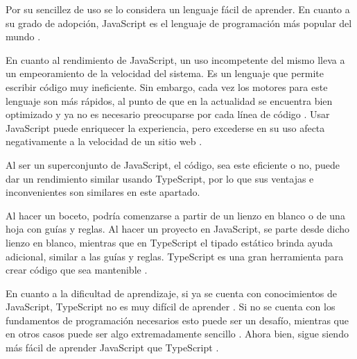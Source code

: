 \documentclass[twoside]{article}
\begin{document}
Por su sencillez de uso se lo considera un lenguaje fácil de aprender. En cuanto a su grado de adopción, JavaScript es el lenguaje de programación más popular del mundo \parencite{w3schoolsJs}. 

En cuanto al rendimiento de JavaScript, un uso incompetente del mismo lleva a un empeoramiento de la velocidad del sistema. Es un lenguaje que permite escribir código muy ineficiente. Sin embargo, cada vez los motores para este lenguaje son más rápidos, al punto de que en la actualidad se encuentra bien optimizado y ya no es necesario preocuparse por cada línea de código \parencite{arturWojnar}. Usar JavaScript puede enriquecer la experiencia, pero excederse en su uso afecta negativamente a la velocidad de un sitio web \parencite{timVanSchie}.

Al ser un superconjunto de JavaScript, el código, sea este eficiente o no, puede dar un rendimiento similar usando TypeScript, por lo que sus ventajas e inconvenientes son similares en este apartado.

Al hacer un boceto, podría comenzarse a partir de un lienzo en blanco o de una hoja con guías y reglas. Al hacer un proyecto en JavaScript, se parte desde dicho lienzo en blanco, mientras que en TypeScript el tipado estático brinda ayuda adicional, similar a las guías y reglas. TypeScript es una gran herramienta para crear código que sea mantenible \parencite{hao}. 

En cuanto a la dificultad de aprendizaje, si ya se cuenta con conocimientos de JavaScript, TypeScript no es muy difícil de aprender \parencite{freecodecampTs}. Si no se cuenta con los fundamentos de programación necesarios esto puede ser un desafío, mientras que en otros casos puede ser algo extremadamente sencillo \parencite{thecodebytes}. Ahora bien, sigue siendo más fácil de aprender JavaScript que TypeScript \parencite{isJsHardToLearn}.
\end{document}
